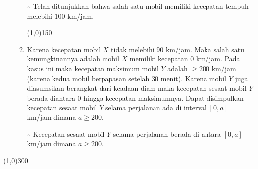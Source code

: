 \begin{enumerate}[leftmargin=*, label={\arabic*}.]
\begin{enumerate}[label={\alph*}.]
    $\therefore$ Telah ditunjukkan bahwa salah satu mobil memiliki kecepatan tempuh melebihi $100$ 
    km/jam.


\begin{center}\line(1,0){150}\end{center}


    \item Karena kecepatan mobil $X$ tidak melebihi $90$ km/jam. Maka salah satu kemungkinannya 
    adalah mobil $X$ memiliki kecepatan $0$ km/jam. Pada kasus ini maka kecepatan maksimum mobil $Y$ 
    adalah $\geq 200$ km/jam (karena kedua mobil berpapasan setelah 30 menit). Karena mobil $Y$ juga 
    diasumsikan berangkat dari keadaan diam maka kecepatan sesaat mobil $Y$ berada diantara $0$ hingga 
    kecepatan maksimumnya. Dapat disimpulkan kecepatan sesaat mobil $Y$ selama perjalanan ada di interval 
    $[0, a]$ km/jam dimana $a \geq 200$.

    $\therefore$ Kecepatan sesaat mobil $Y$ selama perjalanan berada di antara $[0,a]$ km/jam dimana 
    $a \geq 200$.

    \end{enumerate}
\end{enumerate}

\begin{center}\line(1,0){300}\end{center}

